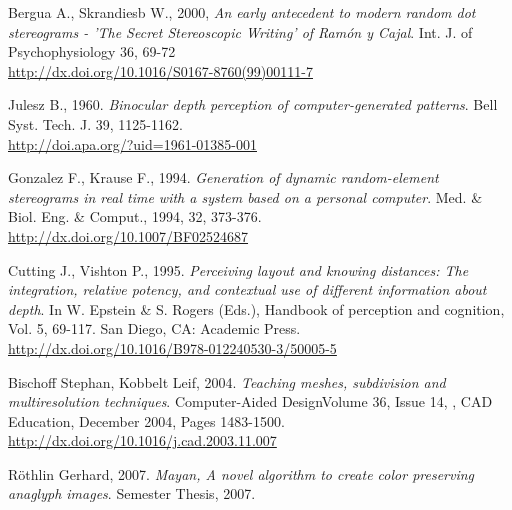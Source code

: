 \begin{thebibliography}{12}
Bergua A., Skrandiesb W., 2000,
\textit{An early antecedent to modern random dot stereograms - 'The Secret Stereoscopic Writing' of Ram\'on y Cajal}.
Int. J. of Psychophysiology 36, 69-72\\
\url{http://dx.doi.org/10.1016/S0167-8760(99)00111-7}

Julesz B., 1960.
\textit{Binocular depth perception of computer-generated patterns}.
Bell Syst. Tech. J. 39, 1125-1162.\\
\url{http://doi.apa.org/?uid=1961-01385-001}

Gonzalez F., Krause F., 1994.
\textit{Generation of dynamic random-element stereograms in real time with a system based on a personal computer}.
Med. \& Biol. Eng. \& Comput., 1994, 32, 373-376.\\
\url{http://dx.doi.org/10.1007/BF02524687}

Cutting J., Vishton P., 1995.
\textit{Perceiving layout and knowing distances: The integration, relative potency, and contextual use of different information about depth}.
In W. Epstein \& S. Rogers (Eds.), Handbook of perception and cognition, Vol. 5, 69-117. San Diego, CA: Academic Press.\\
\url{http://dx.doi.org/10.1016/B978-012240530-3/50005-5}

Bischoff Stephan, Kobbelt Leif, 2004.
\textit{Teaching meshes, subdivision and multiresolution techniques}.
Computer-Aided DesignVolume 36, Issue 14, , CAD Education, December 2004, Pages 1483-1500.\\
\url{http://dx.doi.org/10.1016/j.cad.2003.11.007}

R\"othlin Gerhard, 2007.
\textit{Mayan, A novel algorithm to create color preserving anaglyph images}.
Semester Thesis, 2007.

\end{thebibliography}

\renewcommand*\refname{Links}

\let\oldthebibliography=\thebibliography
\let\endoldthebibliography=\endthebibliography
\renewenvironment{thebibliography}[1]{%
	\begin{oldthebibliography}{#1}%
	\setlength{\parskip}{0.5\parskip}%
	\setlength{\itemsep}{0.5\itemsep}%
}%
{%
	\end{oldthebibliography}%
}

